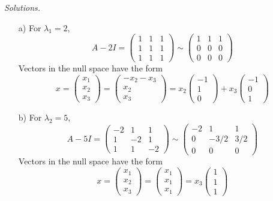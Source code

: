     \ifnum {} {\color{DarkBlue} \textit{Solutions.} 
    \begin{enumerate}
        \item[a)] For $\lambda_1 = 2$, 
        $$A - 2I = \begin{pmatrix} 1&1&1\\1&1&1\\1&1&1\end{pmatrix}\sim\begin{pmatrix} 1&1&1\\0&0&0\\0&0&0\end{pmatrix}$$ Vectors in the null space have the form $$x = \begin{pmatrix}x_1\\x_2\\x_3 \end{pmatrix} = \begin{pmatrix}-x_2-x_3\\x_2\\x_3 \end{pmatrix} = x_2\begin{pmatrix} -1\\1\\0\end{pmatrix} + x_3 \begin{pmatrix} -1\\0\\1\end{pmatrix}$$ 
        \item[b)] For $\lambda_2 = 5$, 
        $$A - 5 I = \begin{pmatrix} -2&1&1\\1&-2&1\\1&1&-2\end{pmatrix}\sim\begin{pmatrix} -2&1&1\\0&-3/2&3/2\\0&0&0\end{pmatrix}$$ Vectors in the null space have the form $$x = \begin{pmatrix}x_1\\x_2\\x_3 \end{pmatrix} = \begin{pmatrix} x_1\\ x_1\\x_1 \end{pmatrix} = x_3 \begin{pmatrix} 1\\ 1\\1

\end{pmatrix}$$
\end{enumerate}}
